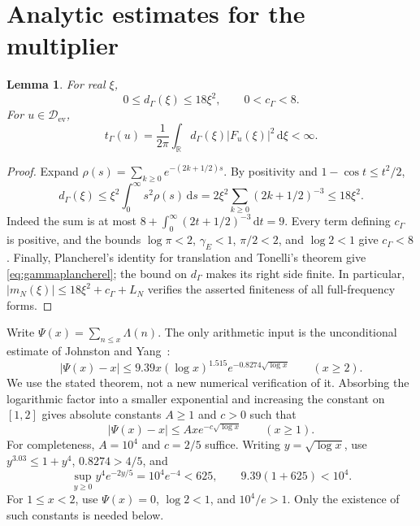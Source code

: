 \documentclass[11pt]{article}
\newtheorem{lemma}[theorem]{Lemma}
\theoremstyle{remark}
\newcommand{\R}{\mathbb R}
\newcommand{\dd}{\,\mathrm d}
\newcommand{\core}{\mathcal D_{\mathrm{ev}}}
\numberwithin{equation}{section}
\begin{document}
\section{Analytic estimates for the multiplier}\label{sec:analytic}
\begin{lemma}\label{lem:gamma}
For real $\xi$,
\begin{equation}\label{eq:gammabounds}
 0\le d_\Gamma(\xi)\le18\xi^2,\qquad 0<c_\Gamma<8.
\end{equation}
For $u\in\core$,
\begin{equation}\label{eq:gammaplancherel}
 t_\Gamma(u)=\frac1{2\pi}\int_\R d_\Gamma(\xi)|F_u(\xi)|^2\dd\xi<\infty.
\end{equation}
\end{lemma}
\begin{proof}
Expand $\rho(s)=\sum_{k\ge0}e^{-(2k+1/2)s}$. By positivity and $1-\cos t\le t^2/2$,
\[
 d_\Gamma(\xi)\le\xi^2\int_0^\infty s^2\rho(s)\dd s
 =2\xi^2\sum_{k\ge0}(2k+1/2)^{-3}\le18\xi^2.
\]
Indeed the sum is at most
$8+\int_0^\infty(2t+1/2)^{-3}\dd t=9$.
Every term defining $c_\Gamma$ is positive, and the bounds
$\log\pi<2$, $\gamma_E<1$, $\pi/2<2$, and $\log2<1$ give $c_\Gamma<8$.
Finally, Plancherel's identity for translation and Tonelli's theorem give \eqref{eq:gammaplancherel}; the bound on $d_\Gamma$ makes its right side finite. In particular, $|m_N(\xi)|\le18\xi^2+c_\Gamma+L_N$ verifies the asserted finiteness of all full-frequency forms.
\end{proof}

Write $\Psi(x)=\sum_{n\le x}\Lambda(n)$. The only arithmetic input is the unconditional estimate of Johnston and Yang~\cite[Theorem~1.1, p.~2]{JY}:
\begin{equation}\label{eq:pnt}
 |\Psi(x)-x|\le9.39x(\log x)^{1.515}
       e^{-0.8274\sqrt{\log x}}\qquad(x\ge2).
\end{equation}
We use the stated theorem, not a new numerical verification of it. Absorbing the logarithmic factor into a smaller exponential and increasing the constant on $[1,2]$ gives absolute constants $A\ge1$ and $c>0$ such that
\begin{equation}\label{eq:weakpnt}
 |\Psi(x)-x|\le Ax e^{-c\sqrt{\log x}}\qquad(x\ge1).
\end{equation}
For completeness, $A=10^4$ and $c=2/5$ suffice. Writing $y=\sqrt{\log x}$, use $y^{3.03}\le1+y^4$, $0.8274>4/5$, and
\[
 \sup_{y\ge0}y^4e^{-2y/5}=10^4e^{-4}<625,
 \qquad 9.39(1+625)<10^4.
\]
For $1\le x<2$, use $\Psi(x)=0$, $\log2<1$, and $10^4/e>1$. Only the existence of such constants is needed below.
\end{document}
